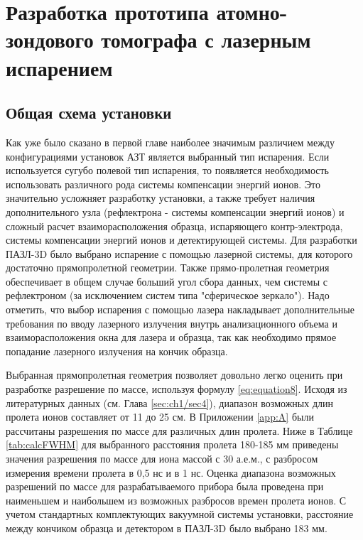 \chapter{Разработка  прототипа атомно-зондового томографа с лазерным испарением}\label{ch:ch2}


\section{Общая схема установки}\label{sec:ch2/sec1}

Как уже было сказано в первой главе наиболее значимым различием между конфигурациями установок АЗТ является выбранный тип испарения. Если используется сугубо полевой тип испарения, то появляется необходимость использовать различного рода системы компенсации энергий ионов. Это значительно усложняет разработку установки, а также требует наличия дополнительного узла (рефлектрона - системы компенсации энергий ионов) и сложный расчет взаиморасположения образца, испаряющего контр-электрода, системы компенсации энергий ионов и детектирующей системы. Для разработки ПАЗЛ-3D \cite{scbibAPPLE} было выбрано испарение с помощью лазерной системы, для которого достаточно прямопролетной геометрии. Также прямо-пролетная геометрия обеспечивает в общем случае больший угол сбора данных, чем системы с рефлектроном (за исключением систем типа "сферическое зеркало"). Надо отметить, что выбор испарения с помощью лазера накладывает дополнительные требования по вводу лазерного излучения внутрь анализационного объема и взаиморасположения окна для лазера и образца, так как необходимо прямое попадание лазерного излучения на кончик образца.

Выбранная прямопролетная геометрия позволяет довольно легко оценить при разработке  разрешение по массе, используя формулу \cref{eq:equation8}. Исходя из литературных данных (см. Глава \cref{sec:ch1/sec4}), диапазон возможных длин пролета ионов составляет от 11 до 25 см. В Приложении \cref{app:A} были рассчитаны разрешения по массе для различных длин пролета. Ниже в Таблице \cref{tab:calcFWHM} для выбранного расстояния пролета 180-185 мм приведены значения разрешения по массе для иона массой с 30 а.е.м., с разбросом измерения времени пролета в 0,5 нс и в 1 нс. Оценка диапазона возможных разрешений по массе для разрабатываемого прибора была проведена при наименьшем и наибольшем из возможных разбросов времен пролета ионов. С учетом  стандартных комплектующих вакуумной системы установки, расстояние между кончиком образца и детектором в ПАЗЛ-3D было выбрано 183 мм.

